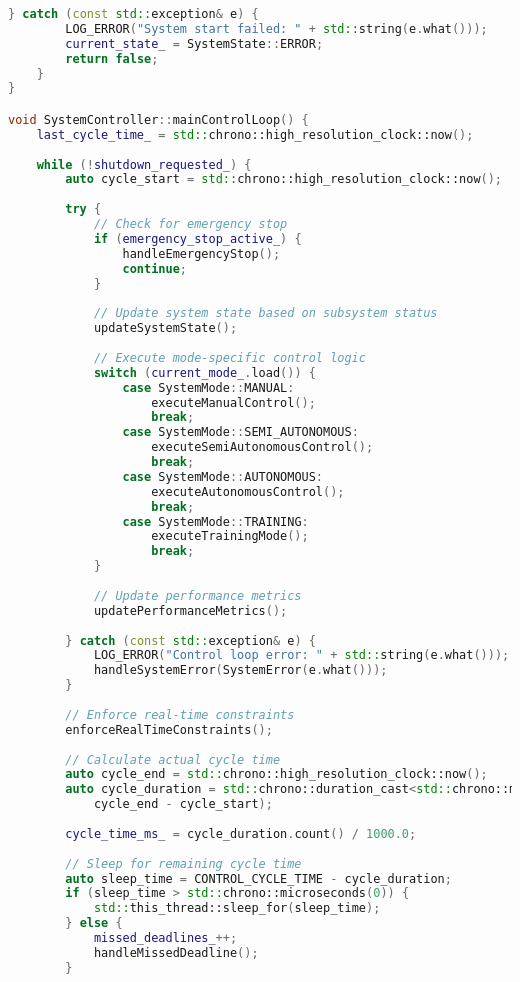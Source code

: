 \begin{lstlisting}[language=C++, caption={Main System Controller Implementation}, label={lst:app-main-controller}]
    } catch (const std::exception& e) {
        LOG_ERROR("System start failed: " + std::string(e.what()));
        current_state_ = SystemState::ERROR;
        return false;
    }
}

void SystemController::mainControlLoop() {
    last_cycle_time_ = std::chrono::high_resolution_clock::now();
    
    while (!shutdown_requested_) {
        auto cycle_start = std::chrono::high_resolution_clock::now();
        
        try {
            // Check for emergency stop
            if (emergency_stop_active_) {
                handleEmergencyStop();
                continue;
            }
            
            // Update system state based on subsystem status
            updateSystemState();
            
            // Execute mode-specific control logic
            switch (current_mode_.load()) {
                case SystemMode::MANUAL:
                    executeManualControl();
                    break;
                case SystemMode::SEMI_AUTONOMOUS:
                    executeSemiAutonomousControl();
                    break;
                case SystemMode::AUTONOMOUS:
                    executeAutonomousControl();
                    break;
                case SystemMode::TRAINING:
                    executeTrainingMode();
                    break;
            }
            
            // Update performance metrics
            updatePerformanceMetrics();
            
        } catch (const std::exception& e) {
            LOG_ERROR("Control loop error: " + std::string(e.what()));
            handleSystemError(SystemError(e.what()));
        }
        
        // Enforce real-time constraints
        enforceRealTimeConstraints();
        
        // Calculate actual cycle time
        auto cycle_end = std::chrono::high_resolution_clock::now();
        auto cycle_duration = std::chrono::duration_cast<std::chrono::microseconds>(
            cycle_end - cycle_start);
        
        cycle_time_ms_ = cycle_duration.count() / 1000.0;
        
        // Sleep for remaining cycle time
        auto sleep_time = CONTROL_CYCLE_TIME - cycle_duration;
        if (sleep_time > std::chrono::microseconds(0)) {
            std::this_thread::sleep_for(sleep_time);
        } else {
            missed_deadlines_++;
            handleMissedDeadline();
        }
        

\end{lstlisting}

